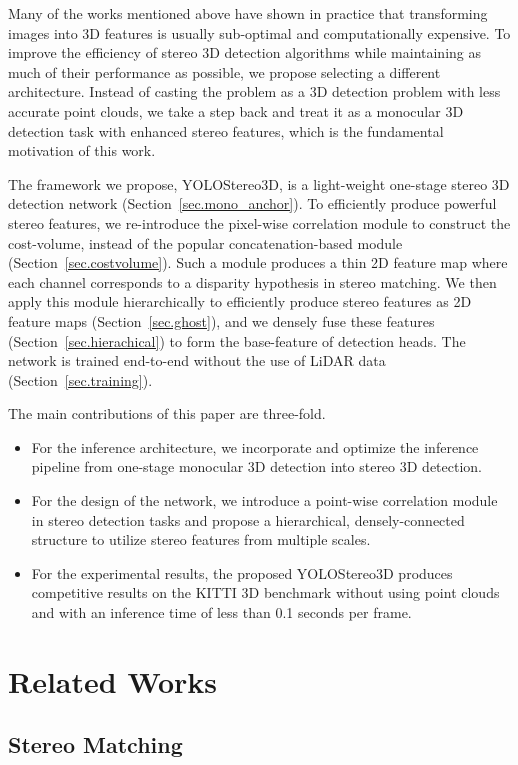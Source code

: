 \documentclass[letterpaper, 10 pt, conference]{ieeeconf}
\begin{document}
Many of the works mentioned above have shown in practice that transforming images into 3D features is usually sub-optimal and computationally expensive.
To improve the efficiency of stereo 3D detection algorithms while maintaining as much of their performance as possible, we propose selecting a different architecture.
Instead of casting the problem as a 3D detection problem with less accurate point clouds, we take a step back and treat it as a monocular 3D detection task with enhanced stereo features, which is the fundamental motivation of this work. 

The framework we propose, YOLOStereo3D, is a light-weight one-stage stereo 3D detection network (Section~\ref{sec.mono_anchor}).
To efficiently produce powerful stereo features, we re-introduce the pixel-wise correlation module to construct the cost-volume, instead of the popular concatenation-based module (Section~\ref{sec.costvolume}). 
Such a module produces a thin 2D feature map where each channel corresponds to a disparity hypothesis in stereo matching.
We then apply this module hierarchically to efficiently produce stereo features as 2D feature maps (Section~\ref{sec.ghost}), and we densely fuse these features (Section~\ref{sec.hierachical}) to form the base-feature of detection heads. The network is trained end-to-end without the use of LiDAR data (Section~\ref{sec.training}).

The main contributions of this paper are three-fold. 
\begin{itemize}
    \item For the inference architecture, we incorporate and optimize the inference pipeline from one-stage monocular 3D detection into stereo 3D detection.
    \item For the design of the network, we introduce a point-wise correlation module in stereo detection tasks and propose a hierarchical, densely-connected structure to utilize stereo features from multiple scales.
    \item For the experimental results, the proposed YOLOStereo3D produces competitive results on the KITTI 3D benchmark without using point clouds and with an inference time of less than 0.1 seconds per frame.
\end{itemize}

 
\section{Related Works}
\label{section:Relate}
\subsection{Stereo Matching}
\end{document}
